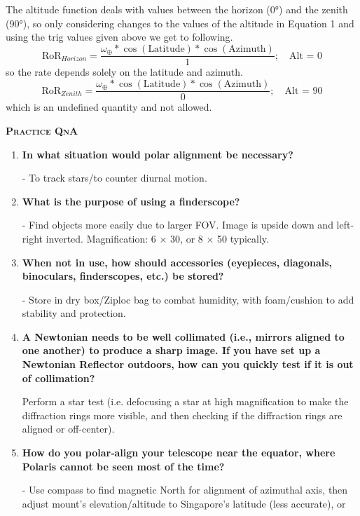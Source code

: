 \documentclass[a4paper,12pt]{extarticle}
\begin{document}
The altitude function deals with values between
the horizon (0°) and the zenith (90°), so only considering changes to the values of the altitude in Equation 1 and using the trig values given above we get to following.
\[\text{RoR}_{Horizon}= \frac{\omega_\oplus \ast \cos(\text{Latitude}) \ast \cos(\text{Azimuth})}{1}; \quad \text{Alt = 0}\]
so the rate depends solely on the latitude and azimuth.
\[	\text{RoR}_{Zenith}= \frac{\omega_\oplus \ast \cos(\text{Latitude}) \ast \cos(\text{Azimuth})}{0}; \quad \text{Alt = 90}\]
which is an undefined quantity and not allowed.


\clearpage
\textsc{\textbf{Practice QnA}}
\begin{enumerate}
	\item \textbf{In what situation would polar alignment be necessary?}
	\begin{sol}
		- To track stars/to counter diurnal motion.
	\end{sol}
	
	\item\textbf{ What is the purpose of using a finderscope?}
	\begin{sol}
		- Find objects more easily due to larger FOV. Image is upside down and left-right inverted.
		Magnification: 6 $\times$ 30, or 8 $\times$ 50 typically.
	\end{sol}
	
	\item \textbf{When not in use, how should accessories (eyepieces, diagonals, binoculars, finderscopes, etc.) be stored?}
	\begin{sol}
		- Store in dry box/Ziploc bag to combat humidity, with foam/cushion to add stability and protection.
	\end{sol}
	
	\item \textbf{A Newtonian needs to be well collimated (i.e., mirrors
	aligned to one another) to produce a sharp image. If you have set up a Newtonian Reflector outdoors, how can you
	quickly test if it is out of collimation?}
	\begin{sol}
		Perform a star test (i.e. defocusing a star at high magnification to make the diffraction rings more visible, and then checking if the diffraction rings are aligned or off-center).
	\end{sol}
	\item \textbf{How do you polar‐align your telescope near the equator, where Polaris cannot be seen most of the time?}
	
	\begin{sol}
		- Use compass to find magnetic North for alignment of azimuthal axis, then adjust mount's elevation/altitude to Singapore’s latitude  (less accurate), or\\
		

\end{sol}
\end{enumerate}
\end{document}
